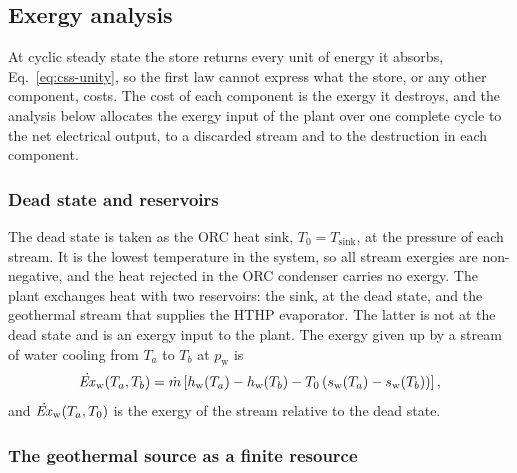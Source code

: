 \subsection{Exergy analysis}
\label{sec:exergy}

At cyclic steady state the store returns every unit of energy it absorbs,
Eq.~\eqref{eq:css-unity}, so the first law cannot express what the store, or
any other component, costs. The cost of each component is the exergy it
destroys, and the analysis below allocates the exergy input of the plant over
one complete cycle to the net electrical output, to a discarded stream and to
the destruction in each component.

\subsubsection{Dead state and reservoirs}

The dead state is taken as the ORC heat sink, $T_0=T_\mathrm{sink}$, at the
pressure of each stream. It is the lowest temperature in the system, so all
stream exergies are non-negative, and the heat rejected in the ORC condenser
carries no exergy. The plant exchanges heat with two reservoirs: the sink, at
the dead state, and the geothermal stream that supplies the HTHP evaporator.
The latter is not at the dead state and is an exergy input to the plant. The
exergy given up by a stream of water cooling from $T_a$ to $T_b$ at
$p_\mathrm{w}$ is
\begin{equation}
  \dot{\mathit{Ex}}_\mathrm{w}(T_a,T_b)=\dot m\left[h_\mathrm{w}(T_a)-h_\mathrm{w}(T_b)
     -T_0\left(s_\mathrm{w}(T_a)-s_\mathrm{w}(T_b)\right)\right],
  \label{eq:ex-stream}
\end{equation}
and $\dot{\mathit{Ex}}_\mathrm{w}(T_a,T_0)$ is the exergy of the stream relative to the
dead state.

\subsubsection{The geothermal source as a finite resource}
\label{sec:geo}


